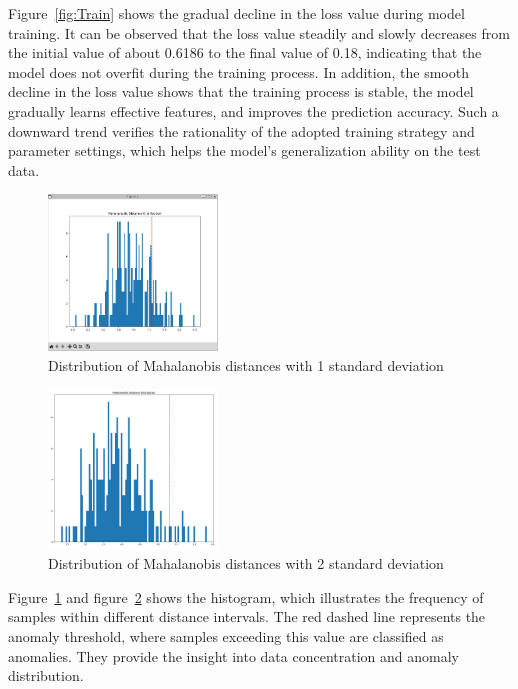 \begin{ZhChapter}
    Figure~\ref{fig:Train} shows the gradual decline in the loss value during model training. It can be observed that the loss value steadily and slowly decreases from the initial value of about 0.6186 to the final value of 0.18, indicating that the model does not overfit during the training process. In addition, the smooth decline in the loss value shows that the training process is stable, the model gradually learns effective features, and improves the prediction accuracy. Such a downward trend verifies the rationality of the adopted training strategy and parameter settings, which helps the model's generalization ability on the test data.

    \begin{figure}[htbp]
        \centering
        \includegraphics[width = 0.4\textwidth]{image/threshould_1.jpg}
        \caption{Distribution of Mahalanobis distances with 1 standard deviation}
        \label{fig:threshould_1}
    \end{figure}

    \begin{figure}[!t]
        \centering
        \includegraphics[width = 0.4\textwidth]{image/threshould_2.jpg}
        \caption{Distribution of Mahalanobis distances with 2 standard deviation}
        \label{fig:threshould_2}
    \end{figure}

    Figure~\ref{fig:threshould_1} and figure~\ref{fig:threshould_2} shows the histogram, which illustrates the frequency of samples within different distance intervals. The red dashed line represents the anomaly threshold, where samples exceeding this value are classified as anomalies. They provide the insight into data concentration and anomaly distribution.


\end{ZhChapter}

